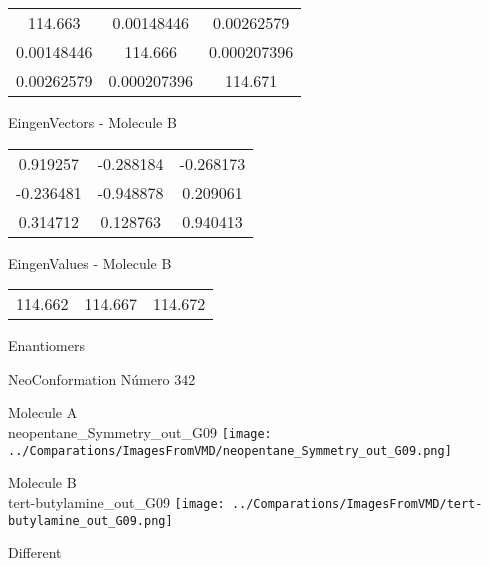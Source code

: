 \begin{multicols}{2}
\begin{center}
\begin{tabular}{|c c c|}
114.663	 & 	0.00148446	 & 	0.00262579	 \\
0.00148446	 & 	114.666	 & 	0.000207396	 \\
0.00262579	 & 	0.000207396	 & 	114.671
\end{tabular}

\vtab
 EingenVectors - Molecule B     \\
\vtab
\begin{tabular}{|c c c|}
0.919257	 & 	-0.288184	 & 	-0.268173	 \\
-0.236481	 & 	-0.948878	 & 	0.209061	 \\
0.314712	 & 	0.128763	 & 	0.940413
\end{tabular}

\vtab
 EingenValues - Molecule B     \\
\vtab
\begin{tabular}{|c c c|}
114.662	 & 	114.667	 & 	114.672	 \\
\end{tabular}

\end{center}
\end{multicols}
\begin{center}
\vtab
\vtab
\textcolor{NavyBlue}{\Large Enantiomers}
\end{center}

 \newpage

\vtab[-2cm]
\begin{center}
{\large NeoConformation \tab Número 342}
\end{center}
\begin{multicols}{2}
\begin{center}
Molecule A \\ 
neopentane\_Symmetry\_out\_G09
\texttt{[image: ../Comparations/ImagesFromVMD/neopentane\_Symmetry\_out\_G09.png]}
\\
\vtab

\columnbreak
Molecule B \\ 
tert-butylamine\_out\_G09
\texttt{[image: ../Comparations/ImagesFromVMD/tert-butylamine\_out\_G09.png]}
\\
\vtab


\end{center}
\end{multicols}
\begin{center}
\vtab
\vtab
\textcolor{NavyBlue}{\Large Different}
\end{center}

